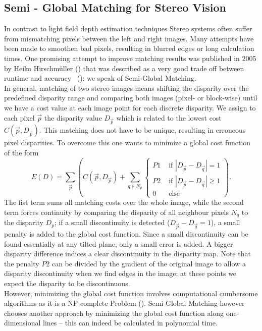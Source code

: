 \documentclass  [
  paper    = a4,
  BCOR     = 10mm,
  twoside,
  fontsize = 12pt,
  fleqn,
  toc      = bibnumbered,
  toc      = listofnumbered,
  numbers  = noendperiod,
  headings = normal,
  listof   = leveldown,
  version  = 3.03
]                                       {scrreprt}
\begin{document}
\subsection{Semi - Global Matching for Stereo Vision}
In contrast to light field depth estimation techniques Stereo systems often suffer from mismatching pixels between the left and right images. Many attempts have been made to smoothen bad pixels, resulting in blurred edges or long calculation times. One promising attempt to improve matching results was published in 2005 by Heiko Hirschmüller (\cite{hirschmuller2005accurate}) that was described as \glqq a very good trade off between runtime and accuracy \grqq $\,$ (\cite{hirschmuller2011semi}): we speak of Semi-Global Matching.\\
In general,  matching of two stereo images means shifting the disparity over the predefined disparity range and comparing both images (pixel- or block-wise) until we have a cost value at each image point for each discrete disparity. We assign to each pixel $\vec{p}$ the disparity value $D_{\vec p}$ which is related to the lowest cost $C(\vec{p}, D_{\vec p})$. This matching does not have to be unique, resulting in erroneous pixel disparities. 
To overcome this one wants to minimize a global cost function of the form 
\begin{equation}\label{eq:global_sgm}
E(D) = \sum_{\vec p} \left(C(\vec{p}, D_{\vec p}) + \sum_{q\in N_p} 
\begin{cases}
	P1 & \text{ if }|D_{\vec p} - D_{\vec q}| = 1\\
	P2 & \text{ if }|D_{\vec p} - D_{\vec q}| \geq 1\\
	0 & \text{ else }
	\end{cases}  
\right).
\end{equation}
The fist term sums all matching costs over the whole image, while the second term forces continuity by comparing the disparity of all neighbour pixels $N_q$ to the disparity $D_p$; if a  small discontinuity is detected ($D_{\vec p} - D_{\vec q} = 1$), a small penalty is added to the global cost function. Since a small discontinuity can be found essentially at any tilted plane, only a small error is added. A bigger disparity difference indices a clear discontinuity in the disparity map. Note that the penalty $P2$ can be divided by the gradient of the original image to allow a disparity discontinuity when we find edges in the image; at these points we expect the disparity to be discontinuous.\\ However, minimizing the global cost function involves computational cumbersome algorithms as it is a NP-complete Problem (\cite{hirschmuller2011semi}). Semi-Global Matching however chooses another approach by minimizing the global cost function along one-dimensional lines -- this can indeed be calculated in polynomial time.
\end{document}
